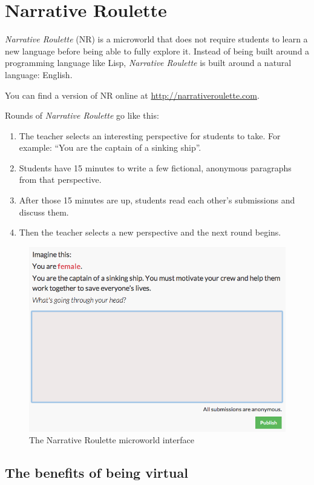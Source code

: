 \section{Narrative Roulette}

\emph{Narrative Roulette} (NR) is a microworld that does not require
students to learn a new language before being able to fully explore it.
Instead of being built around a programming language like Lisp,
\emph{Narrative Roulette} is built around a natural language: English.

You can find a version of NR online at \url{http://narrativeroulette.com}.

Rounds of \emph{Narrative Roulette} go like this: 

\begin{enumerate}
\item The teacher selects an interesting perspective for students to take. For example:
``You are the captain of a sinking ship''. 
\item Students have 15 minutes to write a few fictional, anonymous paragraphs from that perspective. 
\item After those 15 minutes are up, students read each other's
submissions and discuss them.
\item Then the teacher selects a new perspective and the next round begins. 
\end{enumerate}

\begin{figure}[ht!]
\centering
\includegraphics[width=115mm]{img/narrative_editor.png}
\caption{The Narrative Roulette microworld interface}
\label{overflow}
\end{figure}

\subsection{The benefits of being virtual}


